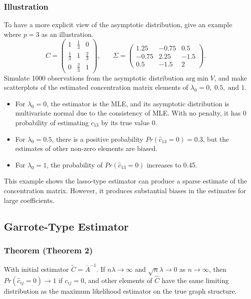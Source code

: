 \subsubsection*{Illustration}
To have a more explicit view of the asymptotic distribution, give an example where $p=3$ as an illustration. 
\[C=\left( \begin{array}{ccc}
1 & \frac{1}{3} & 0 \\
\frac{1}{3} & 1 & \frac{2}{3} \\
0 & \frac{2}{3} & 1 \end{array} \right) \mbox{,}\qquad
\Sigma=\left( \begin{array}{ccc}
1.25 & -0.75 & 0.5 \\
-0.75 & 2.25 & -1.5 \\
0.5 & -1.5 & 2
\end{array} \right) \mbox{.}
\]
Simulate 1000 observations from the asymptotic distribution $\mbox{arg} \min V$, and make scatterplots of the estimated concentration matrix elements of $\lambda_0=0,\; 0.5,\; \mbox{and }1$. 
\begin{itemize}
\item For $\lambda_0=0$, the estimator is the MLE, and its asymptotic distribution is multivariate normal due to the consistency of MLE. With no penalty, it has 0 probability of estimating $c_{13}$ by its true value 0. 
\item For $\lambda_0=0.5$, there is a positive probability $Pr(\hat{c}_{13}=0)=0.3$, but the estimates of other non-zero elements are biased. 
\item For $\lambda_0=1$, the probability of $Pr(\hat{c}_{13}=0)$ increases to 0.45.
\end{itemize}

This example shows the lasso-type estimator can produce a sparse estimate of the concentration matrix. However, it produces substantial biases in the estimates for large coefficients. 

\subsection*{Garrote-Type Estimator}
\subsubsection*{Theorem (Theorem 2)}
With initial estimator $\tilde{C}=\bar{A}^{-1}$. If $n\lambda \rightarrow \infty$ and $\sqrt{n} \lambda \rightarrow 0$ as $n\rightarrow \infty$, then $Pr(\hat{c}_{ij}=0)\rightarrow 1$ if $c_{ij}=0$, and other elements of $\hat{C}$ have the same limiting distribution as the maximum likelihood estimator on the true graph structure. \\

